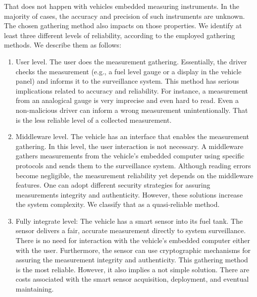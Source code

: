 \documentclass[sigplan]{acmart}
\begin{document}
That does not happen with vehicles embedded measuring instruments.
In the majority of cases, the accuracy and precision of such instruments are unknown.
The chosen gathering method also impacts on those properties.
We identify at least three different levels of reliability, according to the employed gathering methods.
We describe them as follows:
\begin{enumerate}
 \item User level. The user does the measurement gathering. 
  Essentially, the driver checks the measurement (e.g., a fuel level gauge or a display in the vehicle panel) and informs it to the surveillance system. 
  This method has serious implications related to accuracy and reliability.
  For instance, a measurement from an analogical gauge is very imprecise and even hard to read.
  Even a non-malicious driver can inform a wrong measurement unintentionally.
  That is the less reliable level of a collected measurement.
  \item Middleware level. The vehicle has an interface that enables the measurement gathering.
  In this level, the user interaction is not necessary.
  A middleware gathers measurements from the vehicle's embedded computer using specific protocols and sends them to the surveillance system.
  Although reading errors become negligible, the measurement reliability yet depends on the middleware features.
  One can adopt different security strategies for assuring measurements integrity and authenticity.
  However, these solutions increase the system complexity.
  We classify that as a quasi-reliable method.
  \item Fully integrate level: The vehicle has a smart sensor into its fuel tank.
  The sensor delivers a fair, accurate measurement directly to system surveillance.
  There is no need for interaction with the vehicle's embedded computer either with the user.
  Furthermore, the sensor can use cryptographic mechanisms for assuring the measurement integrity and authenticity.
  This gathering method is the most reliable.
  However, it also implies a not simple solution.
  There are costs associated with the smart sensor acquisition, deployment, and eventual maintaining.
\end{enumerate}

\end{document}

